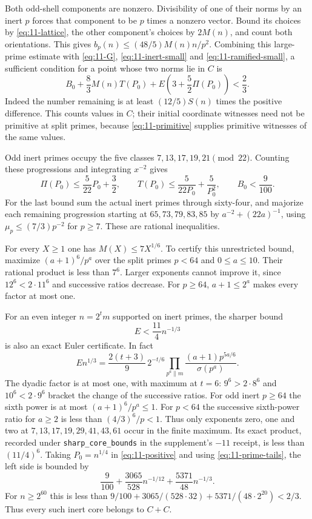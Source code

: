 Both odd-shell components are nonzero.  Divisibility of one of their
norms by an inert $p$ forces that component to be $p$ times a nonzero
vector.  Bound its choices by \eqref{eq:11-lattice}, the other
component's choices by $2M(n)$, and count both orientations.  This gives
$b_p(n)\le(48/5)M(n)n/p^2$.
Combining this large-prime estimate with
\eqref{eq:11-G}, \eqref{eq:11-inert-small} and
\eqref{eq:11-ramified-small}, a sufficient condition for a point
whose two norms lie in $C$ is
\begin{equation}\label{eq:11-positive}
 B_0+\frac83 M(n)T(P_0)
                   +E\left(3+\frac52\Pi(P_0)\right)<\frac23.
\end{equation}
Indeed the number remaining is at least $(12/5)S(n)$ times the
positive difference.  This counts values in $C$; their initial
coordinate witnesses need not be primitive at split primes, because
\eqref{eq:11-primitive} supplies primitive witnesses of the same values.

Odd inert primes occupy the five classes $7,13,17,19,21\pmod{22}$.
Counting these progressions and integrating $x^{-2}$ gives
\begin{equation}\label{eq:11-prime-tails}
 \Pi(P_0)\le\frac5{22}P_0+\frac32,\qquad
 T(P_0)\le\frac5{22P_0}+\frac5{P_0^2},\qquad B_0<\frac9{100}.
\end{equation}
For the last bound sum the actual inert primes through sixty-four,
and majorize each remaining progression starting at
$65,73,79,83,85$ by $a^{-2}+(22a)^{-1}$, using
$\mu_p\le(7/3)p^{-2}$ for $p\ge7$.  These are rational inequalities.

For every $X\ge1$ one has $M(X)\le7X^{1/6}$.
To certify this unrestricted bound, maximize $(a+1)^6/p^a$ over the
split primes $p<64$ and $0\le a\le10$.  Their rational product is
less than $7^6$.  Larger exponents cannot improve it, since
$12^6<2\cdot11^6$ and successive ratios decrease.  For $p\ge64$,
$a+1\le2^a$ makes every factor at most one.

For an even integer $n=2^t m$ supported on inert primes, the sharper
bound
\begin{equation}\label{eq:11-sharp-E}
                         E<\frac{11}{4}n^{-1/3}
\end{equation}
is also an exact Euler certificate.  In fact
\[
 E n^{1/3}=\frac{2(t+3)}9\,2^{-t/6}
   \prod_{p^a\parallel m}\frac{(a+1)p^{5a/6}}{\sigma(p^a)}.
\]
The dyadic factor is at most one, with maximum at $t=6$:
$9^6>2\cdot8^6$ and $10^6<2\cdot9^6$ bracket the change of the
successive ratios.  For odd inert $p\ge64$ the sixth power is at
most $(a+1)^6/p^a\le1$.  For $p<64$ the successive sixth-power
ratio for $a\ge2$ is less than $(4/3)^6/p<1$.  Thus only exponents
zero, one and two at $7,13,17,19,29,41,43,61$ occur in the finite
maximum. Its exact product, recorded under
\texttt{sharp\_core\_bounds} in the supplement's \(-11\) receipt,
is less than \((11/4)^6\).
Taking $P_0=n^{1/4}$ in \eqref{eq:11-positive} and using
\eqref{eq:11-prime-tails}, the left side is bounded by
\[
 \frac9{100}+\frac{3065}{528}n^{-1/12}
                         +\frac{5371}{48}n^{-1/3}.
\]
For $n\ge2^{60}$ this is less than
$9/100+3065/(528\cdot32)+5371/(48\cdot2^{20})<2/3$.
Thus every such inert core belongs to $C+C$.


